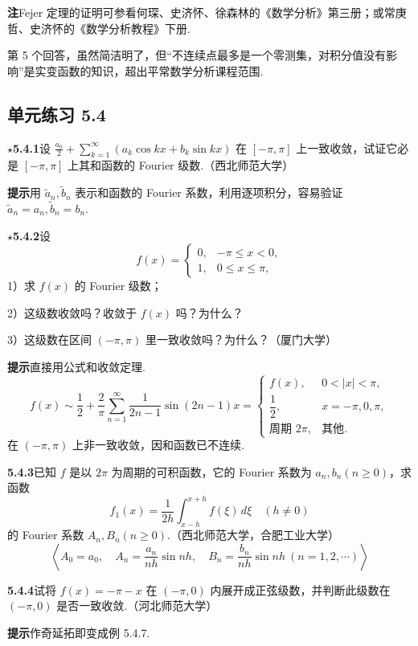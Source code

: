\documentclass[UTF8, 12pt, fontset=fandol, oneside]{ctexart}
\begin{document}
\noindent\textbf{注}\quad Fejer 定理的证明可参看何琛、史济怀、徐森林的《数学分析》第三册；或常庚哲、史济怀的《数学分析教程》下册.

第 5 个回答，虽然简洁明了，但“不连续点最多是一个零测集，对积分值没有影响”是实变函数的知识，超出平常数学分析课程范围.

\subsection*{单元练习 5.4}

\noindent\(\star\)\textbf{5.4.1}\quad 设
$\displaystyle\frac{a_0}{2}+\sum_{k=1}^{\infty}(a_k\cos kx+b_k\sin kx)$
在 $[-\pi,\pi]$ 上一致收敛，试证它必是 $[-\pi,\pi]$ 上其和函数的 Fourier 级数.（西北师范大学）

\noindent\textbf{提示}\quad 用 $\tilde a_n,\tilde b_n$ 表示和函数的 Fourier 系数，利用逐项积分，容易验证
$\tilde a_n=a_n,\tilde b_n=b_n$.

\noindent\(\star\)\textbf{5.4.2}\quad 设
\[
  f(x)=
  \begin{cases}
  0,&-\pi\le x<0,\\
  1,&0\le x\le\pi,
  \end{cases}
\]
1）求 $f(x)$ 的 Fourier 级数；

2）这级数收敛吗？收敛于 $f(x)$ 吗？为什么？

3）这级数在区间 $(-\pi,\pi)$ 里一致收敛吗？为什么？（厦门大学）

\noindent\textbf{提示}\quad 直接用公式和收敛定理.
\[
  f(x)\sim\frac12+\frac2\pi\sum_{n=1}^{\infty}\frac1{2n-1}\sin(2n-1)x
  =
  \begin{cases}
  f(x),&0<|x|<\pi,\\
  \dfrac12,&x=-\pi,0,\pi,\\
  \text{周期 }2\pi,&\text{其他}.
  \end{cases}
\]
在 $(-\pi,\pi)$ 上非一致收敛，因和函数已不连续.

\noindent\textbf{5.4.3}\quad 已知 $f$ 是以 $2\pi$ 为周期的可积函数，它的 Fourier 系数为 $a_n,b_n(n\ge0)$，求函数
\[
  f_1(x)=\frac1{2h}\int_{x-h}^{x+h}f(\xi)\,d\xi\quad(h\ne0)
\]
的 Fourier 系数 $A_n,B_n(n\ge0)$.（西北师范大学，合肥工业大学）
\[
  \left\langle A_0=a_0,\quad A_n=\frac{a_n}{nh}\sin nh,\quad
  B_n=\frac{b_n}{nh}\sin nh\ (n=1,2,\cdots)\right\rangle
\]

\noindent\textbf{5.4.4}\quad 试将 $f(x)=-\pi-x$ 在 $(-\pi,0)$ 内展开成正弦级数，并判断此级数在 $(-\pi,0)$ 是否一致收敛.（河北师范大学）

\noindent\textbf{提示}\quad 作奇延拓即变成例 5.4.7.
\end{document}
